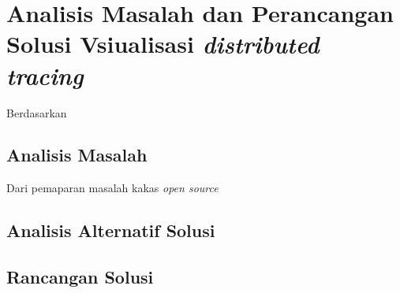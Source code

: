 \chapter{Analisis Masalah dan Perancangan Solusi Vsiualisasi \textit{distributed tracing}}

Berdasarkan 


\section{Analisis Masalah}

Dari pemaparan masalah kakas \textit{open source} 



\section{Analisis Alternatif Solusi}

\section{Rancangan Solusi}


